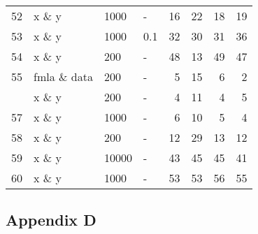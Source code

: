 \begin{Schunk}
\begin{table}
\begin{tabular}[t]{rlllrrrr}
52 & x \& y & 1000 & - & 16 & 22 & 18 & 19\\
53 & x \& y & 1000 & 0.1 & 32 & 30 & 31 & 36\\
54 & x \& y & 200 & - & 48 & 13 & 49 & 47\\
55 & fmla \& data & 200 & - & 5 & 15 & 6 & 2\\
\addlinespace
56 & x \& y & 200 & - & 4 & 11 & 4 & 5\\
57 & x \& y & 1000 & - & 6 & 10 & 5 & 4\\
58 & x \& y & 200 & - & 12 & 29 & 13 & 12\\
59 & x \& y & 10000 & - & 43 & 45 & 45 & 41\\
60 & x \& y & 1000 & - & 53 & 53 & 56 & 55\\
\bottomrule
\end{tabular}
\end{table}

\end{Schunk}

\hypertarget{appendix-d}{%
\subsection{Appendix D}\label{appendix-d}}

